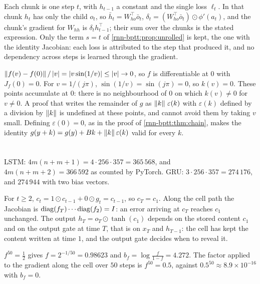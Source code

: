 Each chunk is one step $t$, with $h_{t-1}$ a constant and the single loss $\ell_t$. In that chunk $h_t$ has only the child $o_t$,
so $\bar h_t = W_{ho}^\top\bar o_t$, $\delta_t = (W_{ho}^\top\bar o_t)\odot\phi'(a_t)$, and the chunk's gradient for $W_{hh}$ is $\delta_th_{t-1}^\top$; their sum over the
chunks is the stated expression. Only the term $s = t$ of \cref{rnn-bptt:prop:unrolled} is kept, the
one with the identity Jacobian: each loss is attributed to the step that produced it, and no
dependency across steps is learned through the gradient.

$\left\|f(v) - f(0)\right\|/\left|v\right| = \left|v\sin(1/v)\right|\leq\left|v\right|\to0$, so $f$ is differentiable at $0$ with $J_f(0) = 0$. For $v = 1/(j\pi)$, $\sin(1/v) = \sin(j\pi) = 0$,
so $k(v) = 0$. These points accumulate at $0$: there is no neighbourhood of $0$ on which $k(v)\neq0$ for $v\neq0$. A proof
that writes the remainder of $g$ as $\left\|k\right\|\,\varepsilon(k)$ with $\varepsilon(k)$ defined by a division by $\left\|k\right\|$ is undefined at these
points, and cannot avoid them by taking $v$ small. Defining $\varepsilon(0) = 0$, as in the proof of
\cref{rnn-bptt:thm:chain}, makes the identity $g(y + k) = g(y) + Bk + \left\|k\right\|\varepsilon(k)$ valid for every $k$.

\section{}

LSTM: $4m(n + m + 1) = 4\cdot256\cdot357 = 365\,568$, and $4m(n + m + 2) = 366\,592$ as counted by PyTorch. GRU:
$3\cdot256\cdot357 = 274\,176$, and $274\,944$ with two bias vectors.

For $t\geq2$, $c_t = 1\odot c_{t-1} + 0\odot g_t = c_{t-1}$, so $c_T = c_1$. Along the cell path the Jacobian is $\operatorname{diag}(f_T)\cdots\operatorname{diag}(f_2) = I$:
an error arriving at $c_T$ reaches $c_1$ unchanged. The output $h_T = o_T\odot\tanh(c_1)$ depends on the stored content $c_1$ and
on the output gate at time $T$, that is on $x_T$ and $h_{T-1}$: the cell has kept the content written at time
$1$, and the output gate decides when to reveal it.

$f^{50} = \tfrac12$ gives $f = 2^{-1/50} = 0.98623$ and $b_f = \log\frac f{1 - f} = 4.272$. The factor applied to the gradient along
the cell over $50$ steps is $f^{50} = 0.5$, against $0.5^{50}\approx8.9\times10^{-16}$ with $b_f = 0$.


